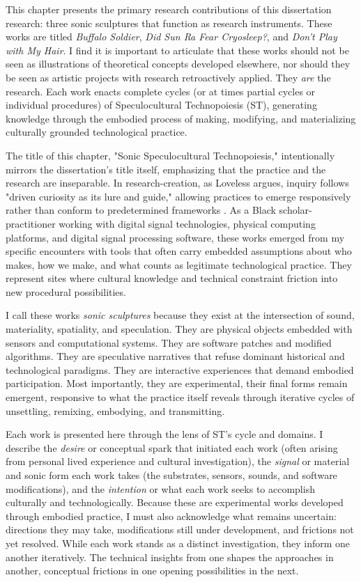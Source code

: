 This chapter presents the primary research contributions of this dissertation research: three sonic sculptures that function as research instruments. These works are titled \emph{Buffalo Soldier}, \emph{Did Sun Ra Fear Cryosleep?}, and \emph{Don't Play with My Hair}. I find it is important to articulate that these works should not be seen as illustrations of theoretical concepts developed elsewhere, nor should they be seen as artistic projects with research retroactively applied. They \textit{are} the research. Each work enacts complete cycles (or at times partial cycles or individual procedures) of Speculocultural Technopoiesis (ST), generating knowledge through the embodied process of making, modifying, and materializing culturally grounded technological practice.

The title of this chapter, "Sonic Speculocultural Technopoiesis," intentionally mirrors the dissertation's title itself, emphasizing that the practice and the research are inseparable. In research-creation, as Loveless argues, inquiry follows "driven curiosity as its lure and guide," allowing practices to emerge responsively rather than conform to predetermined frameworks \parencite[105]{Loveless_2019}. As a Black scholar-practitioner working with digital signal technologies, physical computing platforms, and digital signal processing software, these works emerged from my specific encounters with tools that often carry embedded assumptions about who makes, how we make, and what counts as legitimate technological practice. They represent sites where cultural knowledge and technical constraint friction into new procedural possibilities.

I call these works \textit{sonic sculptures} because they exist at the intersection of sound, materiality, spatiality, and speculation. They are physical objects embedded with sensors and computational systems. They are software patches and modified algorithms. They are speculative narratives that refuse dominant historical and technological paradigms. They are interactive experiences that demand embodied participation. Most importantly, they are experimental, their final forms remain emergent, responsive to what the practice itself reveals through iterative cycles of unsettling, remixing, embodying, and transmitting.

Each work is presented here through the lens of ST's cycle and domains. I describe the \textit{desire} or conceptual spark that initiated each work (often arising from personal lived experience and cultural investigation), the \textit{signal} or material and sonic form each work takes (the substrates, sensors, sounds, and software modifications), and the \textit{intention} or what each work seeks to accomplish culturally and technologically. Because these are experimental works developed through embodied practice, I must also acknowledge what remains uncertain: directions they may take, modifications still under development, and frictions not yet resolved. While each work stands as a distinct investigation, they inform one another iteratively. The technical insights from one shapes the approaches in another, conceptual frictions in one opening possibilities in the next.

